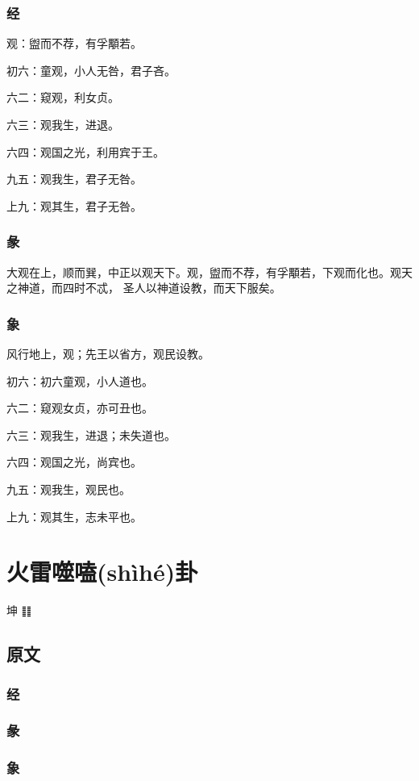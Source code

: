 \documentclass[12pt,oneside]{book}
\begin{document}
\subsection{经}
观：盥而不荐，有孚顒若。

初六：童观，小人无咎，君子吝。

六二：窥观，利女贞。

六三：观我生，进退。

六四：观国之光，利用宾于王。

九五：观我生，君子无咎。

上九：观其生，君子无咎。

\subsection{彖}
大观在上，顺而巽，中正以观天下。观，盥而不荐，有孚顒若，下观而化也。观天之神道，而四时不忒， 圣人以神道设教，而天下服矣。

\subsection{象}
风行地上，观；先王以省方，观民设教。

初六：初六童观，小人道也。

六二：窥观女贞，亦可丑也。

六三：观我生，进退；未失道也。

六四：观国之光，尚宾也。

九五：观我生，观民也。

上九：观其生，志未平也。


\chapter{火雷噬嗑(shìhé)卦}
坤 ䷁

\section{原文}
\subsection{经}
\subsection{彖}
\subsection{象}
\end{document}
